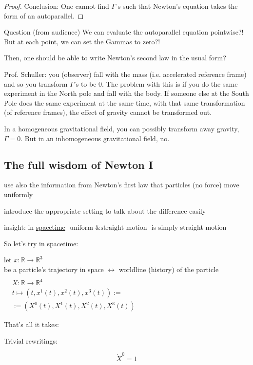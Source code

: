 \documentclass[10pt, twoside]{amsart}
\begin{document}
\begin{multicols*}{2}
\begin{proof}
Conclusion: One cannot find $\Gamma$ s such that Newton's equation takes the form of an autoparallel.

\end{proof}

Question (from audience) We can evaluate the autoparallel equation pointwise?! But at each point, we can set the Gammas to zero?!

Then, one should be able to write Newton's second law in the usual form?

Prof. Schuller: you (observer) fall with the mass (i.e. accelerated reference frame) and so you transform $\Gamma$'s to be $0$.  The problem with this is if you do the same experiment in the North pole and fall with the body.  If someone else at the South Pole does the same experiment at the same time, with that same transformation (of reference frames), the effect of gravity cannot be transformed out.

In a homogeneous gravitational field, you can possibly transform away gravity, $\Gamma=0$.  But in an inhomogeneous gravitational field, no.

\subsection{The full wisdom of Newton I}

use also the information from Newton's first law that particles (no force) move uniformly 

introduce the appropriate setting to talk about the difference easily

insight: in \underline{spacetime} $\boxed{ \text{ uniform \& straight motion }}$ is simply straight motion

So let's try in \underline{spacetime}: 

let $x: \mathbb{R} \to \mathbb{R}^3$ \\
\phantom{\quad } be a particle's trajectory in space $\longleftrightarrow $ worldline (history) of the particle $\begin{aligned} & \quad \\
  & X : \mathbb{R} \to \mathbb{R}^4  \\
  & t\mapsto (t, x^1(t), x^2(t),x^3(t)) := \\
  & := (X^0(t), X^1(t),X^2(t),X^3(t)) \end{aligned}$

That's all it takes:

Trivial rewritings:

\[
\dot{X}^0 =1
\]


\end{multicols*}
\end{document}
